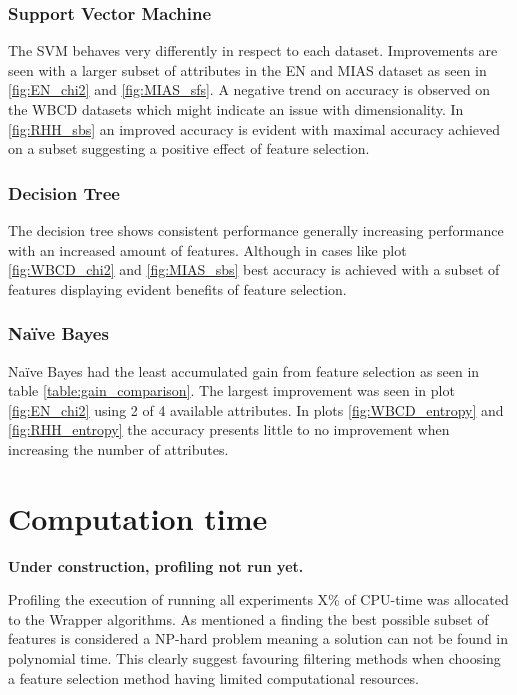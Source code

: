 \subsubsection{Support Vector Machine}

The SVM behaves very differently in respect to each dataset. Improvements are seen with a larger subset of attributes in the EN and MIAS dataset as seen in \ref{fig:EN_chi2} and \ref{fig:MIAS_sfs}. A negative trend on accuracy is observed on the WBCD datasets which might indicate an issue with dimensionality. In \ref{fig:RHH_sbs} an improved accuracy is evident with maximal accuracy achieved on a subset suggesting a positive effect of feature selection.

\subsubsection{Decision Tree}

The decision tree shows consistent performance generally increasing performance with an increased amount of features. Although in cases like plot \ref{fig:WBCD_chi2} and \ref{fig:MIAS_sbs} best accuracy is achieved with a subset of features displaying evident benefits of feature selection.

\subsubsection{Naïve Bayes}

Naïve Bayes had the least accumulated gain from feature selection as seen in table \ref{table:gain_comparison}. The largest improvement was seen in plot \ref{fig:EN_chi2} using 2 of 4 available attributes. In plots \ref{fig:WBCD_entropy} and \ref{fig:RHH_entropy} the accuracy presents little to no improvement when increasing the number of attributes.






\newpage
\section{Computation time}

\textbf{Under construction, profiling not run yet.}

Profiling the execution of running all experiments X\% of CPU-time was allocated to the Wrapper algorithms. As mentioned a finding the best possible subset of features is considered a NP-hard problem meaning a solution can not be found in polynomial time. This clearly suggest favouring filtering methods when choosing a feature selection method having limited computational resources.

